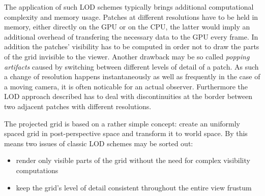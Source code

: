 The application of such LOD schemes typically brings additional computational
complexity and memory usage. Patches at different resolutions have to be held
in memory, either directly on the GPU or on the CPU, the latter would imply an
additional overhead of transfering the necessary data to the GPU every frame.
In addition the patches' visibility has to be computed in order not to draw the
parts of the grid invisible to the viewer. Another drawback may be so called
\textit{popping artifacts} caused by switching between different levels of
detail of a patch. As such a change of resolution happens instantaneously as
well as frequently in the case of a moving camera, it is often noticable for an
actual observer. Furthermore the LOD approach described has to deal with
discontinuities at the border between two adjacent patches with different
resolutions.

The projected grid is based on a rather simple concept: create an uniformly
spaced grid in post-perspective space and transform it to world space. By
this means two issues of classic LOD schemes may be sorted out:
\begin{itemize}
 \item render only visible parts of the grid without the need for complex
visibility computations
 \item keep the grid's level of detail consistent throughout the entire view
frustum
\end{itemize}

